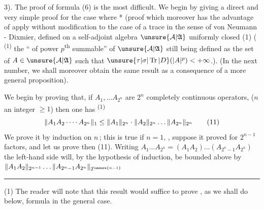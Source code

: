 3). The proof of formula (6) is the most difficult.
We begin by giving a
direct and very simple proof for the case where
  *
(proof which moreover has the advantage
of  apply without modification to the case of a
trace  in the sense of von Neumann - Dixmier, defined
on a self-adjoint algebra $\unsure{\mathcal A|\mathfrak A}$ 
 uniformly closed 
(1) ( \textsuperscript{(1)} the ``  of power
$p$\textsuperscript{th} summable'' of $\unsure{\mathcal A|\mathfrak A}$ 
still being defined
as the set of $A\in\unsure{\mathcal A|\mathfrak A}$ such that
$\unsure{\tau|\sigma|\operatorname{Tr}|D}(|A|^p)<+\infty$.)\textsuperscript{}.
(In the next number, we
shall moreover obtain the same result as
a consequence of a more general proposition).

We begin by proving that, if
$A_1,\ldots A_{2^n}$ are $2^n$ completely continuous operators,
($n$ an integer $\geq1$) then one has \textsuperscript{(1)}
\[
\|A_1 A_2\mathinner{\cdotp\cdotp\cdotp\cdotp} A_{2^n}\|_1\leq\|A_1\|_{2^n}\cdot\|A_2\|_{2^n}\ldots\|A_{2^n}\|_{2^n}\tag*{(11)}
\]
We prove it by induction on $n$\,;
this is true if $n=1$,  , suppose
it proved  for $2^{n-1}$ factors, and let us prove
then (11). Writing $A_1\ldots A_{2^n}=(A_1A_2)\ldots(A_{2^n-1}A_{2^n})$
the left-hand side will, by the hypothesis
of induction, be bounded above by $\|A_1A_2\|_{2^{n-1}}\ldots\|A_{2^n-1}A_{2^n}\|_{2^{\unsure{n-1}}}$

\noindent\rule{\linewidth}{0.3pt}

(1) The reader will note that this result would suffice to
prove  , as we shall do below,
formula  in the general case.
